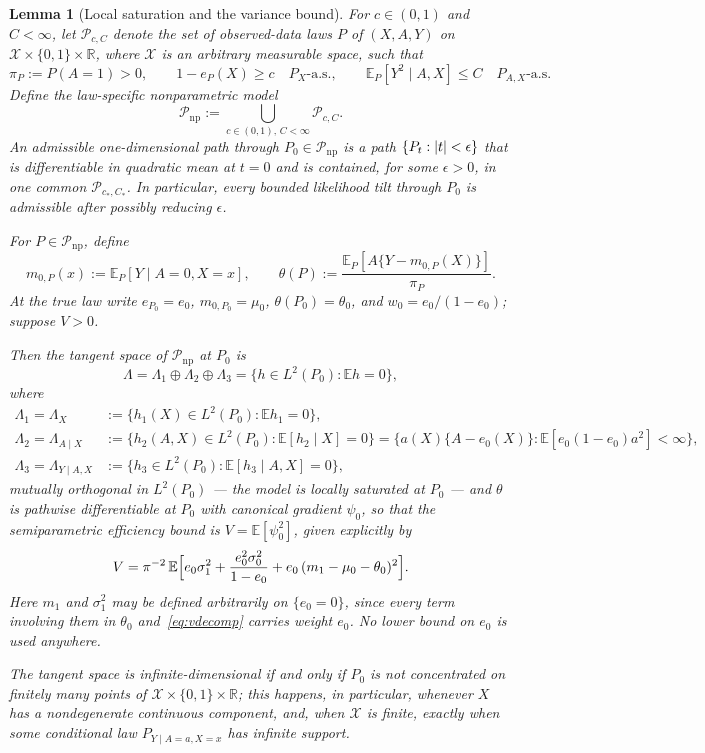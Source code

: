 \documentclass[11pt]{article}
\theoremstyle{plain}
\newtheorem{lemma}[theorem]{Lemma}
\theoremstyle{definition}
\theoremstyle{remark}
\newcommand{\E}{\mathbb{E}}
\newcommand{\R}{\mathbb{R}}
\newcommand{\cX}{\mathcal{X}}
\newcommand{\cP}{\mathcal{P}}
\newcommand{\ez}{e_0}
\newcommand{\mz}{\mu_0}
\newcommand{\wz}{w_0}
\DeclarePairedDelimiter{\abs}{\lvert}{\rvert}
\begin{document}
\begin{lemma}[Local saturation and the variance bound]\label{lem:tangent}
For $c\in(0,1)$ and $C<\infty$, let $\cP_{c,C}$ denote the set of
observed-data laws $P$ of $(X,A,Y)$ on
$\cX\times\{0,1\}\times\R$, where $\cX$ is an arbitrary measurable space,
such that
\[
  \pi_P:=P(A=1)>0,\qquad
  1-e_P(X)\ge c\quad P_X\text{-a.s.},
  \qquad
  \E_P[Y^2\mid A,X]\le C\quad P_{A,X}\text{-a.s.}
\]
Define the law-specific nonparametric model
\[
  \cP_{\mathrm{np}}
  :=\bigcup_{c\in(0,1),\,C<\infty}\cP_{c,C}.
\]
An \emph{admissible} one-dimensional path through $P_0\in\cP_{\mathrm{np}}$
is a path $\{P_t:\abs t<\epsilon\}$ that is differentiable in quadratic
mean at $t=0$ and is contained, for some $\epsilon>0$, in one common
$\cP_{c_*,C_*}$. In particular, every bounded likelihood tilt through
$P_0$ is admissible after possibly reducing $\epsilon$.

For $P\in\cP_{\mathrm{np}}$, define
\[
  m_{0,P}(x):=\E_P[Y\mid A=0,X=x],\qquad
  \theta(P):=\frac{\E_P[A\{Y-m_{0,P}(X)\}]}{\pi_P}.
\]
At the true law write $e_{P_0}=\ez$, $m_{0,P_0}=\mz$,
$\theta(P_0)=\theta_0$, and $\wz=\ez/(1-\ez)$; suppose $V>0$.

Then the tangent space of $\cP_{\mathrm{np}}$ at $P_0$ is
\[
  \Lambda
  =\Lambda_1\oplus\Lambda_2\oplus\Lambda_3
  =\{h\in L^2(P_0):\E h=0\},
\]
where
\begin{align*}
  \Lambda_1=\Lambda_X
  &:=\{h_1(X)\in L^2(P_0):\E h_1=0\},\\
  \Lambda_2=\Lambda_{A\mid X}
  &:=\{h_2(A,X)\in L^2(P_0):\E[h_2\mid X]=0\}
  =\bigl\{a(X)\{A-\ez(X)\}:\E[\ez(1-\ez)a^2]<\infty\bigr\},\\
  \Lambda_3=\Lambda_{Y\mid A,X}
  &:=\{h_3\in L^2(P_0):\E[h_3\mid A,X]=0\},
\end{align*}
mutually orthogonal in $L^2(P_0)$ --- the model is locally saturated at
$P_0$ --- and $\theta$ is pathwise differentiable at $P_0$ with canonical
gradient $\psi_0$, so that the semiparametric efficiency bound is
$V=\E[\psi_0^2]$, given explicitly by
\begin{equation}\label{eq:vdecomp}
  V=\pi^{-2}\,\E\Bigl[\ez\sigma_1^2
   +\frac{\ez^2\sigma_0^2}{1-\ez}
   +\ez\,(m_1-\mz-\theta_0)^2\Bigr].
\end{equation}
Here $m_1$ and $\sigma_1^2$ may be defined arbitrarily on $\{\ez=0\}$,
since every term involving them in $\theta_0$ and~\eqref{eq:vdecomp}
carries weight $\ez$. No lower bound on $\ez$ is used anywhere.

The tangent space is infinite-dimensional if and only if $P_0$ is not
concentrated on finitely many points of $\cX\times\{0,1\}\times\R$; this
happens, in particular, whenever $X$ has a nondegenerate continuous
component, and, when $\cX$ is finite, exactly when some conditional law
$P_{Y\mid A=a,X=x}$ has infinite support.
\end{lemma}
\end{document}
